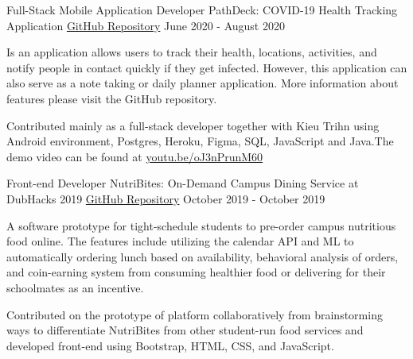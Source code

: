 \begin{cventries}
{\begin{cvitems}
{        }
      \end{cvitems}
    }
 \cventry
    {Full-Stack Mobile Application Developer} %
    {PathDeck: COVID-19 Health Tracking Application} %
    {\href{https://github.com/nussarafirn/pathdeck}{GitHub Repository}} %
    {June 2020 - August 2020} %
    {
      \begin{cvitems} %
        \item {
          Is an application allows users to track their health, locations, activities, and notify people in contact quickly if they get infected. However, this application can also serve as a note taking or daily planner application. More information about features please visit the GitHub repository. 
        }
        \item {
          Contributed mainly as a full-stack developer together with Kieu Trihn using Android environment, Postgres, Heroku, Figma, SQL, JavaScript and Java.The demo video can be found at \href{https://youtu.be/oJ3nPrunM60}{youtu.be/oJ3nPrunM60 
        }}
      \end{cvitems}
    }

   \cventry
    {Front-end Developer} %
    {NutriBites: On-Demand Campus Dining Service at DubHacks 2019} %
     {\href{https://github.com/nussarafirn/Dubhacks2019}{GitHub Repository}} %
    {October 2019 - October 2019} %
    {
      \begin{cvitems} %
        \item {
         A software prototype for tight-schedule students to pre-order campus nutritious food online. The features include utilizing the calendar API and ML to automatically ordering lunch based on availability, behavioral analysis of orders, and coin-earning system from consuming healthier food or delivering for their schoolmates as an incentive.
        }
        \item {
          Contributed on the prototype of platform collaboratively from brainstorming ways to differentiate NutriBites from other student-run food services and developed front-end using Bootstrap, HTML, CSS, and JavaScript.}
      \end{cvitems}
    }


\end{cventries}

